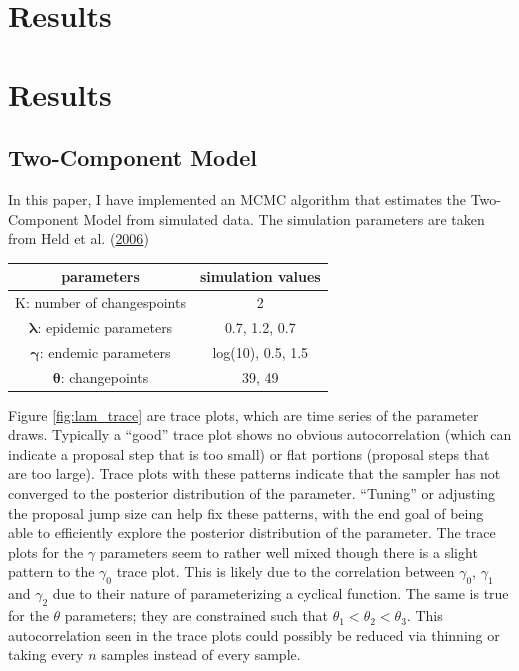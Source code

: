 \documentclass[]{article}
\numberwithin{equation}{section}
\begin{document}
\hypertarget{results}{%
\section{Results}\label{results}}

\hypertarget{results-1}{%
\section{Results}\label{results-1}}

\hypertarget{two-component-model}{%
\subsection{Two-Component Model}\label{two-component-model}}

In this paper, I have implemented an MCMC algorithm that estimates the
Two-Component Model from simulated data. The simulation parameters are
taken from Held et al.
(\protect\hyperlink{ref-held_two-component_2006}{2006})

\begin{longtable}[]{@{}cc@{}}
\toprule
parameters & simulation values\tabularnewline
\midrule
\endhead
K: number of changespoints & 2\tabularnewline
\(\boldsymbol{\lambda}\): epidemic parameters & 0.7, 1.2,
0.7\tabularnewline
\(\boldsymbol{\gamma}\): endemic parameters & log(10), 0.5,
1.5\tabularnewline
\(\boldsymbol{\theta}\): changepoints & 39, 49\tabularnewline
\bottomrule
\end{longtable}

Figure \ref{fig:lam_trace} are trace plots, which are time series of the
parameter draws. Typically a ``good'' trace plot shows no obvious
autocorrelation (which can indicate a proposal step that is too small)
or flat portions (proposal steps that are too large). Trace plots with
these patterns indicate that the sampler has not converged to the
posterior distribution of the parameter. ``Tuning'' or adjusting the
proposal jump size can help fix these patterns, with the end goal of
being able to efficiently explore the posterior distribution of the
parameter. The trace plots for the \(\gamma\) parameters seem to rather
well mixed though there is a slight pattern to the \(\gamma_0\) trace
plot. This is likely due to the correlation between \(\gamma_0\),
\(\gamma_1\) and \(\gamma_2\) due to their nature of parameterizing a
cyclical function. The same is true for the \(\theta\) parameters; they
are constrained such that \(\theta_1 < \theta_2 < \theta_3\). This
autocorrelation seen in the trace plots could possibly be reduced via
thinning or taking every \(n\) samples instead of every sample.
\end{document}

